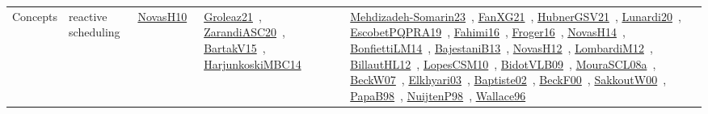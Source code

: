 {\begin{longtable}{lp{3cm}>{\raggedright\arraybackslash}p{6cm}>{\raggedright\arraybackslash}p{6cm}>{\raggedright\arraybackslash}p{8cm}}
Concepts & reactive scheduling & \href{../works/NovasH10.pdf}{NovasH10}~\cite{NovasH10} & \href{../works/Groleaz21.pdf}{Groleaz21}~\cite{Groleaz21}, \href{../works/ZarandiASC20.pdf}{ZarandiASC20}~\cite{ZarandiASC20}, \href{../works/BartakV15.pdf}{BartakV15}~\cite{BartakV15}, \href{../works/HarjunkoskiMBC14.pdf}{HarjunkoskiMBC14}~\cite{HarjunkoskiMBC14} & \href{../works/Mehdizadeh-Somarin23.pdf}{Mehdizadeh-Somarin23}~\cite{Mehdizadeh-Somarin23}, \href{../works/FanXG21.pdf}{FanXG21}~\cite{FanXG21}, \href{../works/HubnerGSV21.pdf}{HubnerGSV21}~\cite{HubnerGSV21}, \href{../works/Lunardi20.pdf}{Lunardi20}~\cite{Lunardi20}, \href{../works/EscobetPQPRA19.pdf}{EscobetPQPRA19}~\cite{EscobetPQPRA19}, \href{../works/Fahimi16.pdf}{Fahimi16}~\cite{Fahimi16}, \href{../works/Froger16.pdf}{Froger16}~\cite{Froger16}, \href{../works/NovasH14.pdf}{NovasH14}~\cite{NovasH14}, \href{../works/BonfiettiLM14.pdf}{BonfiettiLM14}~\cite{BonfiettiLM14}, \href{../works/BajestaniB13.pdf}{BajestaniB13}~\cite{BajestaniB13}, \href{../works/NovasH12.pdf}{NovasH12}~\cite{NovasH12}, \href{../works/LombardiM12.pdf}{LombardiM12}~\cite{LombardiM12}, \href{../works/BillautHL12.pdf}{BillautHL12}~\cite{BillautHL12}, \href{../works/LopesCSM10.pdf}{LopesCSM10}~\cite{LopesCSM10}, \href{../works/BidotVLB09.pdf}{BidotVLB09}~\cite{BidotVLB09}, \href{../works/MouraSCL08a.pdf}{MouraSCL08a}~\cite{MouraSCL08a}, \href{../works/BeckW07.pdf}{BeckW07}~\cite{BeckW07}, \href{../works/Elkhyari03.pdf}{Elkhyari03}~\cite{Elkhyari03}, \href{../works/Baptiste02.pdf}{Baptiste02}~\cite{Baptiste02}, \href{../works/BeckF00.pdf}{BeckF00}~\cite{BeckF00}, \href{../works/SakkoutW00.pdf}{SakkoutW00}~\cite{SakkoutW00}, \href{../works/PapaB98.pdf}{PapaB98}~\cite{PapaB98}, \href{../works/NuijtenP98.pdf}{NuijtenP98}~\cite{NuijtenP98}, \href{../works/Wallace96.pdf}{Wallace96}~\cite{Wallace96}\\

\end{longtable}}
